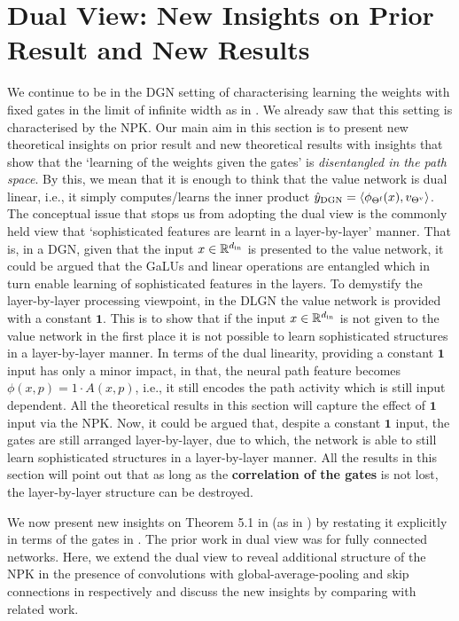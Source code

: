\section{Dual View: New Insights on Prior Result and New Results}\label{sec:analysis}
 We continue to be in the DGN setting of characterising learning the weights with fixed gates in the limit of infinite width as in . We already saw that this setting is characterised by the NPK. Our main aim in this section is to present new theoretical insights on prior result and new theoretical results with insights that show that the `learning of the weights given the gates' is \emph{disentangled in the path space}. By this, we mean that it is enough to think that the value network is dual linear, i.e., it simply computes/learns the inner product $\hat{y}_{\text{DGN}}=\langle \phi_{\Theta^{\textrm{f}}}(x),v_{{\Theta}^{\text{v}}}\rangle$. The conceptual issue that stops us from adopting the dual view is the commonly held view that `sophisticated features are learnt in a layer-by-layer' manner. That is, in a DGN, given that the input $x\in\mathbb{R}^{d_{\text{in}}}$  is presented to the value network, it could be argued that the GaLUs and linear operations are entangled which in turn enable learning of sophisticated features in the layers. To demystify the layer-by-layer processing viewpoint, in the DLGN the value network is provided with a constant $\mathbf{1}$. This is to show that if the input $x\in\mathbb{R}^{d_{\text{in}}}$ is not given to the value network in the first place it is not possible to learn sophisticated structures in a layer-by-layer manner. In terms of the dual linearity, providing a constant $\mathbf{1}$ input has only a minor impact, in that, the neural path feature becomes $\phi(x,p)=1\cdot A(x,p)$, i.e., it still encodes the path activity which is still input dependent. All the theoretical results in this section will capture the effect of $\mathbf{1}$ input via the NPK. Now, it could be argued that, despite a constant $\mathbf{1}$ input, the gates are still arranged layer-by-layer, due to which, the network is able to still learn sophisticated structures in a layer-by-layer manner. All the results in this section will point out that as long as the \textbf{correlation of the gates} is not lost, the layer-by-layer structure can be destroyed.

We now present new insights on Theorem 5.1 in \citep{npk} (as in ) by restating it explicitly in terms of the gates in . The prior work in dual view was for fully connected networks. Here, we extend the dual view to reveal additional structure of the NPK in the presence of convolutions with global-average-pooling and skip connections in  respectively and discuss the new insights by comparing with related work.


